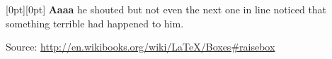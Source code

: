 \documentclass{article}
\begin{document}
\raisebox{0pt}[0pt][0pt]{\Large%
  \textbf{Aaaa%
  }
}
he shouted but not even the next
one in line noticed that something
terrible had happened to him.


Source: \url{http://en.wikibooks.org/wiki/LaTeX/Boxes#raisebox}
\end{document}
